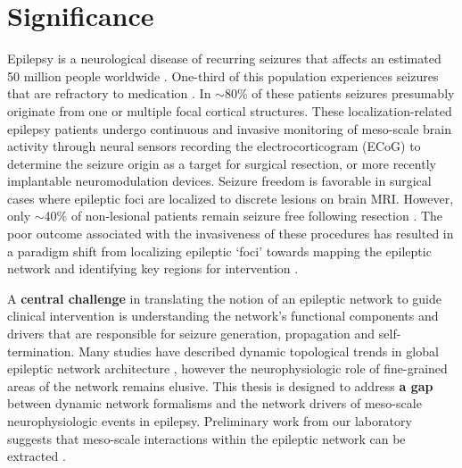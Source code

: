 \section{Significance}
Epilepsy is a neurological disease of recurring seizures that affects an estimated 50 million people worldwide \cite{kwan2000early}. One-third of this population experiences seizures that are refractory to medication \cite{kwan2000early}. In $\sim$80\% of these patients seizures presumably originate from one or multiple focal cortical structures. These localization-related epilepsy patients undergo continuous and invasive monitoring of meso-scale brain activity through neural sensors recording the electrocorticogram (ECoG) to determine the seizure origin as a target for surgical resection, or more recently implantable neuromodulation devices. Seizure freedom is favorable in surgical cases where epileptic foci are localized to discrete lesions on brain MRI. However, only $\sim$40\% of non-lesional patients remain seizure free following resection \cite{french2007refractory}. The poor outcome associated with the invasiveness of these procedures has resulted in a paradigm shift from localizing epileptic `foci' towards mapping the epileptic network and identifying key regions for intervention \cite{spencer2002neural, kramer2012epilepsy, lehnertz2014evolving}.

A \textbf{central challenge} in translating the notion of an epileptic network to guide clinical intervention is understanding the network's functional components and drivers that are responsible for seizure generation, propagation and self-termination. Many studies have described dynamic topological trends in global epileptic network architecture \cite{jerger2005multivariate, schindler2006assessing, schindler2008evolving, kramer2010coalescence, jiruska2012synchronization}, however the neurophysiologic role of fine-grained areas of the network remains elusive. This thesis is designed to address \textbf{a gap} between dynamic network formalisms and the network drivers of meso-scale neurophysiologic events in epilepsy. Preliminary work from our laboratory suggests that meso-scale interactions within the epileptic network can be extracted \cite{khambhati2014dynamic}.

